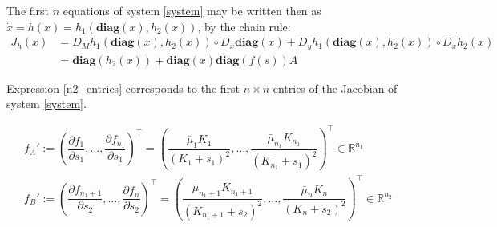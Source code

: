 \documentclass[3p,times]{elsarticle}
\newcommand{\R}{\mathbb{R}}
\newcommand{\diag}{\textbf{diag}}
\begin{document}
The first $n$ equations of system \eqref{system} may be written then as$\dot{x} =  h(x) = h_1(\diag(x), h_2(x))$, by the chain rule: 
\begin{align} J_h(x) &= D_M h_1(\diag(x),h_2(x))\circ D_x \diag (x) + D_yh_1(\diag(x),h_2(x))\circ D_xh_2(x)  \\ &=
\diag(h_2(x))+\diag(x)\diag(f(s))A  \label{n2_entries}
\end{align}

Expression \eqref{n2_entries} corresponds to the first $n\times n$ entries of the Jacobian of system \eqref{system}.

\begin{align*}
f_A' := \left( \dfrac{\partial f_1}{\partial s_1}, \dots, \dfrac{\partial f_{n_1}}{\partial s_1} \right)^\top = \left(\dfrac{\bar{\mu}_1K_1}{(K_1 + s_1)^2},\dots, \dfrac{\bar{\mu}_{n_1}K_{n_1}}{(K_{n_1} + s_1)^2} \right)^\top \in \R^{n_1} \\
f_B' := \left( \dfrac{\partial f_{n_1+1}}{\partial s_2}, \dots, \dfrac{\partial f_{n}}{\partial s_2} \right)^\top = \left( \dfrac{\bar{\mu}_{n_1+1}K_{n_1+1}}{(K_{n_1+1} + s_2)^2},\dots, \dfrac{\bar{\mu}_{n}K_{n}}{(K_{n} + s_2)^2} \right)^\top \in \R^{n_2}
\end{align*}
\end{document}
